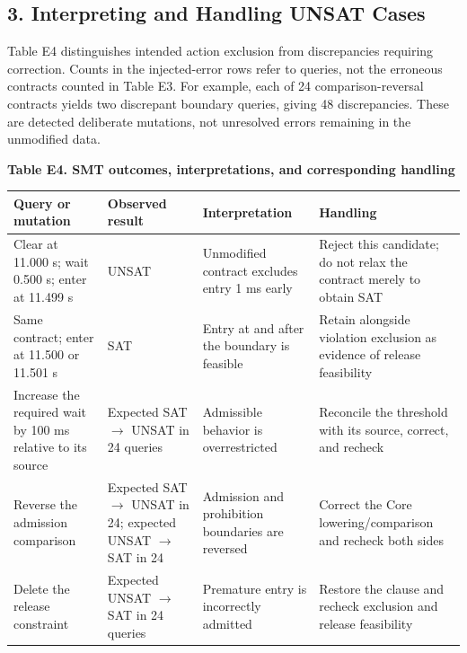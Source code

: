 \documentclass[11pt,a4paper]{article}
\begin{document}
\subsection*{3. Interpreting and Handling UNSAT Cases}

Table E4 distinguishes intended action exclusion from discrepancies requiring correction. Counts in the injected-error rows refer to queries, not the erroneous contracts counted in Table E3. For example, each of 24 comparison-reversal contracts yields two discrepant boundary queries, giving 48 discrepancies. These are detected deliberate mutations, not unresolved errors remaining in the unmodified data.\par

\par\medskip\noindent\begin{minipage}{\linewidth}
\textbf{Table E4. SMT outcomes, interpretations, and corresponding handling}\par

\par\medskip\noindent\begin{minipage}{\linewidth}\small
\begin{tabular}{@{}>{\raggedright\arraybackslash}p{}>{\raggedright\arraybackslash}p{}>{\raggedright\arraybackslash}p{}>{\raggedright\arraybackslash}p{}@{}}
\toprule
\textbf{Query or mutation} & \textbf{Observed result} & \textbf{Interpretation} & \textbf{Handling} \\
\midrule
Clear at 11.000 s; wait 0.500 s; enter at 11.499 s & UNSAT & Unmodified contract excludes entry 1 ms early & Reject this candidate; do not relax the contract merely to obtain SAT \\
Same contract; enter at 11.500 or 11.501 s & SAT & Entry at and after the boundary is feasible & Retain alongside violation exclusion as evidence of release feasibility \\
Increase the required wait by 100 ms relative to its source & Expected SAT \ensuremath{\rightarrow} UNSAT in 24 queries & Admissible behavior is overrestricted & Reconcile the threshold with its source, correct, and recheck \\
Reverse the admission comparison & Expected SAT \ensuremath{\rightarrow} UNSAT in 24; expected UNSAT \ensuremath{\rightarrow} SAT in 24 & Admission and prohibition boundaries are reversed & Correct the Core lowering/comparison and recheck both sides \\
Delete the release constraint & Expected UNSAT \ensuremath{\rightarrow} SAT in 24 queries & Premature entry is incorrectly admitted & Restore the clause and recheck exclusion and release feasibility \\
\bottomrule\end{tabular}\end{minipage}\par\medskip
\end{minipage}\par\medskip
\end{document}
